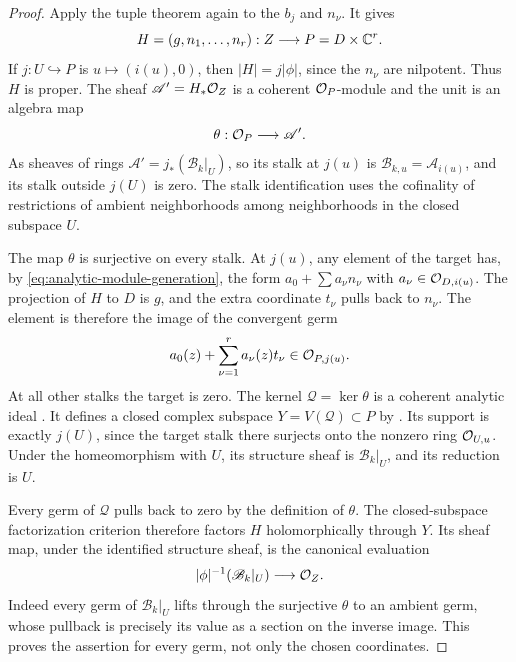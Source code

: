 \begin{proof}
Apply the tuple theorem again to the \(b_j\) and \(n_\nu\).  It gives
\[
 H=(g,n_1,\ldots,n_r):Z\longrightarrow P=D\times\mathbb C^r.
\]
If \(j:U\hookrightarrow P\) is \(u\mapsto(i(u),0)\), then
\(|H|=j|\phi|\), since the \(n_\nu\) are nilpotent.  Thus \(H\)
is proper.  The sheaf \(\mathscr A'=H_*\mathcal O_Z\) is a coherent
\(\mathcal O_P\)-module and the unit is an algebra map
\[
 \theta:\mathcal O_P\longrightarrow\mathscr A'.
\]
As sheaves of rings \(\mathscr A'=j_*(\mathscr B_k|_U)\), so its
stalk at \(j(u)\) is \(\mathscr B_{k,u}=\mathscr A_{i(u)}\), and
its stalk outside \(j(U)\) is zero.  The stalk identification uses
the cofinality of restrictions of ambient neighborhoods among
neighborhoods in the closed subspace \(U\).

The map \(\theta\) is surjective on every stalk.  At \(j(u)\), any
element of the target has, by \eqref{eq:analytic-module-generation},
the form \(a_0+\sum a_\nu n_\nu\) with
\(a_\nu\in\mathcal O_{D,i(u)}\).  The projection of \(H\) to \(D\) is
\(g\), and the extra coordinate \(t_\nu\) pulls back to \(n_\nu\).
The element is therefore the image of the convergent germ
\[
 a_0(z)+\sum_{\nu=1}^r a_\nu(z)t_\nu\in\mathcal O_{P,j(u)}.
\]
At all other stalks the target is zero.  The kernel
\(\mathscr Q=\ker\theta\) is a coherent analytic ideal
\cite[pp.~9-07--9-08]{Grothendieck1961TechniquesII}.  It defines a closed
complex subspace \(Y=V(\mathscr Q)\subset P\) by
\cite[Definition~2.2 and adjacent construction, p.~9-10]{Grothendieck1961TechniquesII}.
Its support is exactly
\(j(U)\), since the target stalk there surjects onto the nonzero ring
\(\mathcal O_{U,u}\).  Under the homeomorphism with \(U\), its structure
sheaf is \(\mathscr B_k|_U\), and its reduction is \(U\).

Every germ of \(\mathscr Q\) pulls back to zero by the definition of
\(\theta\).  The closed-subspace factorization criterion
\cite[pp.~9-04--9-05]{Grothendieck1961TechniquesII} therefore factors
\(H\) holomorphically through \(Y\).  Its sheaf map, under the
identified structure sheaf, is the canonical evaluation
\[
 |\phi|^{-1}(\mathscr B_k|_U)\longrightarrow\mathcal O_Z.
\]
Indeed every germ of \(\mathscr B_k|_U\) lifts through the surjective
\(\theta\) to an ambient germ, whose pullback is precisely its value
as a section on the inverse image.  This proves the assertion for every
germ, not only the chosen coordinates.


\end{proof}
